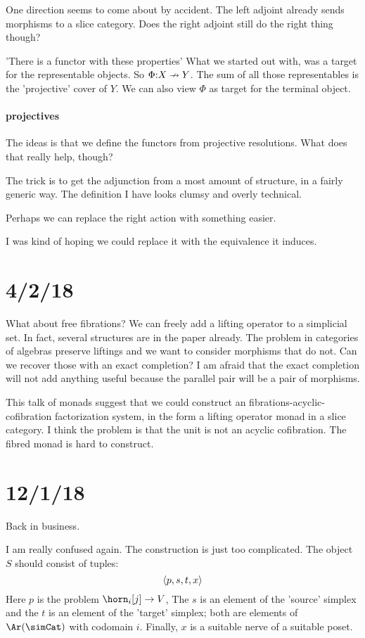 \documentclass[csh.tex]{subfiles}
\begin{document}
One direction seems to come about by accident. The left adjoint already sends morphisms to a slice category. Does the right adjoint still do the right thing though?

'There is a functor with these properties'
What we started out with, was a target for the representable objects.
So $\Phi \mathord : X\nrightarrow Y$.
The sum of all those representables is the 'projective' cover of $Y$.
We can also view $\Phi$ as target for the terminal object.

\paragraph{projectives}
The ideas is that we define the functors from projective resolutions.
What does that really help, though?

The trick is to get the adjunction from a most amount of structure, in a fairly generic way. The definition I have looks clumsy and overly technical.

Perhaps we can replace the right action with something easier.

I was kind of hoping we could replace it with the equivalence it induces. 








\section{4/2/18}
What about free fibrations?
We can freely add a lifting operator to a simplicial set. In fact, several structures are in the paper already. The problem in categories of algebras preserve liftings and we want to consider morphisms that do not. Can we recover those with an exact completion?
I am afraid that the exact completion will not add anything useful because the parallel pair will be a pair of morphisms.

This talk of monads suggest that we could construct an fibrations-acyclic-cofibration factorization system, in the form a lifting operator monad in a slice category. I think the problem is that the unit is not an acyclic cofibration. The fibred monad is hard to construct.


\section{12/1/18}
Back in business.

I am really confused again. The construction is just too complicated.
The object $S$ should consist of tuples:
\[ \left\langle p,s,t,x \right\rangle \]
Here $p$ is the problem $\horn_i[j]\to V$,
The $s$ is an element of the 'source' simplex and 
the $t$ is an element of the 'target' simplex;
both are elements of $\Ar(\simCat)$ with codomain $i$.
Finally, $x$ is a suitable nerve of a suitable poset.
\end{document}
